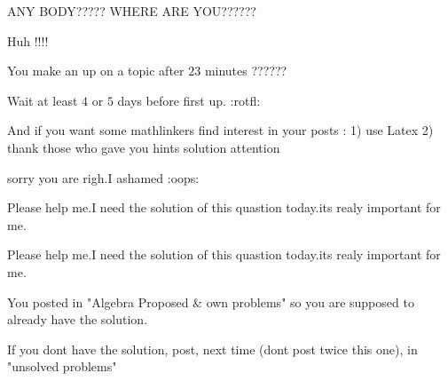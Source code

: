 \begin{solution}
	\begin{tcolorbox}ANY BODY????? WHERE ARE YOU??????\end{tcolorbox}

Huh !!!!

You make an up on a topic after $ 23$ minutes ??????

Wait at least $ 4$ or $ 5$ days before first up.
 :rotfl:

And if you want some mathlinkers find interest in your posts :
1) use Latex
2) thank those who gave you hints \/ solution \/ attention
\end{solution}



\begin{solution}
	sorry you are righ.I ashamed :oops:
\end{solution}



\begin{solution}
	Please help me.I need the solution of this quastion today.its realy important for me.
\end{solution}



\begin{solution}
	\begin{tcolorbox}Please help me.I need the solution of this quastion today.its realy important for me.\end{tcolorbox}

You posted in "Algebra Proposed & own problems" so you are supposed to already have the solution.

If you dont have the solution, post, next time (dont post twice this one), in "unsolved problems"
\end{solution}



